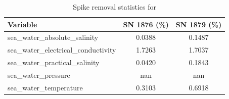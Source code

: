 \begin{table}[h]
\centering
\caption{Spike removal statistics for \projectname{} \casenumber{}}
\label{tab:str12_spike_stats}
\begin{tabular}{|l|c|c|}
\hline
Variable & SN 1876 (\%) & SN 1879 (\%) \\
\hline
sea\_water\_absolute\_salinity & 0.0388 & 0.1487 \\
sea\_water\_electrical\_conductivity & 1.7263 & 1.7037 \\
sea\_water\_practical\_salinity & 0.0420 & 0.1843 \\
sea\_water\_pressure & nan & nan \\
sea\_water\_temperature & 0.3103 & 0.6918 \\
\hline
\end{tabular}
\end{table}
